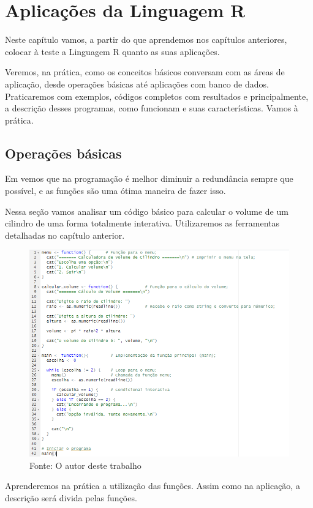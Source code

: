 %


\chapter{ Aplica\c{c}\~{o}es da Linguagem R}
	Neste capítulo vamos, a partir do que aprendemos nos capítulos anteriores, colocar à teste a Linguagem R quanto as suas aplicações.\par Veremos, na prática, como os conceitos básicos conversam com as áreas de aplicação, desde operações básicas até aplicações com banco de dados. Praticaremos com exemplos, códigos completos com resultados e principalmente, a descrição desses programas, como funcionam e suas características. Vamos à prática.
    \section{Opera\c{c}\~{o}es b\'{a}sicas}
    Em \cite{Lander2017} vemos que na programação é melhor diminuir a redundância sempre que possível, e as funções são uma ótima maneira de fazer isso.\par Nessa seção vamos analisar um código básico para calcular o volume de um cilindro de uma forma totalmente interativa. Utilizaremos as ferramentas detalhadas no capítulo anterior.
     \begin{figure}[H]
     	\centering
     	\caption{}
     	\includegraphics[width=1.0\linewidth]{Prints/screenshot018}
     	\label{fig:screenshot018}
     	{\tiny \sf Fonte: O autor deste trabalho }
     \end{figure}
      Aprenderemos na prática a utilização das funções. Assim como na aplicação, a descrição será divida pelas funções.
